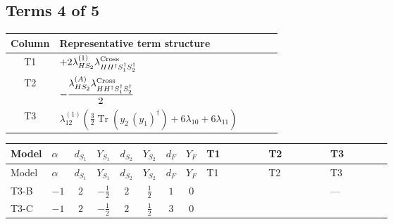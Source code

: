 \documentclass[8pt]{article}
\begin{document}
\begin{landscape}
\subsection*{Terms 4 of 5}
\begin{center}
\begin{tabular}{@{}c >{\raggedright\arraybackslash}p{0.82\linewidth}@{}}
\toprule
Column & Representative term structure \\
\midrule
T1 & \(\displaystyle +2 {\lambda_{HS_2}^{(1)}} {\lambda_{H H^\dagger S_1^\dagger S_2^\dagger}^{\rm Cross}}\) \\
\midrule
T2 & \(\displaystyle -\frac{{\lambda_{HS_2}^{(A)}} {\lambda_{H H^\dagger S_1^\dagger S_2^\dagger}^{\rm Cross}}}{2}\) \\
\midrule
T3 & \(\displaystyle {\lambda_{12}^{(1)}} \left(\frac{3}{2} \operatorname{Tr}\!\left({y_2}\,\left({y_1}\right)^{\dagger}\right)+6 {\lambda_{10}}+6 {\lambda_{11}}\right)\) \\
\midrule
\bottomrule
\end{tabular}
\end{center}
\smallskip
\tiny
\begin{longtable}{@{}llcccccc >{\raggedright\arraybackslash}p{0.21\linewidth} >{\raggedright\arraybackslash}p{0.21\linewidth} >{\raggedright\arraybackslash}p{0.21\linewidth}@{}}
\toprule
Model & $\alpha$ & $d_{S_1}$ & $Y_{S_1}$ & $d_{S_2}$ & $Y_{S_2}$ & $d_F$ & $Y_F$ & T1 & T2 & T3 \\
\midrule
\endfirsthead
\toprule
Model & $\alpha$ & $d_{S_1}$ & $Y_{S_1}$ & $d_{S_2}$ & $Y_{S_2}$ & $d_F$ & $Y_F$ & T1 & T2 & T3 \\
\midrule
\endhead
T3-B & $-1$ & $2$ & $-\frac{1}{2}$ & $2$ & $\frac{1}{2}$ & $1$ & $0$ & \scriptsize\adjustbox{max width=\linewidth}{$\begin{gathered} +2 {\lambda_{HS_2}^{(1)}} {\lambda_{H H^\dagger S_1^\dagger S_2^\dagger}^{\rm Cross}}\end{gathered}$} & \scriptsize\adjustbox{max width=\linewidth}{$\begin{gathered} -\frac{{\lambda_{HS_2}^{(A)}} {\lambda_{H H^\dagger S_1^\dagger S_2^\dagger}^{\rm Cross}}}{2}\end{gathered}$} & --- \\
\midrule
T3-C & $-1$ & $2$ & $-\frac{1}{2}$ & $2$ & $\frac{1}{2}$ & $3$ & $0$ & \scriptsize\adjustbox{max width=\linewidth}{$\begin{gathered} +2 {\lambda_{HS_2}^{(1)}} {\lambda_{H H^\dagger S_1^\dagger S_2^\dagger}^{\rm Cross}}\end{gathered}$} & \scriptsize\adjustbox{max width=\linewidth}{$\begin{gathered} -\frac{{\lambda_{HS_2}^{(A)}} {\lambda_{H H^\dagger S_1^\dagger S_2^\dagger}^{\rm Cross}}}{2}\end{gathered}$} & \scriptsize\adjustbox{max width=\linewidth}{$\begin{gathered} {\lambda_{12}^{(1)}} \left(\frac{3}{2} \operatorname{Tr}\!\left({y_2}\,\left({y_1}\right)^{\dagger}\right)+6 {\lambda_{10}}+6 {\lambda_{11}}\right)\end{gathered}$} \\

\end{longtable}
\end{landscape}
\end{document}
